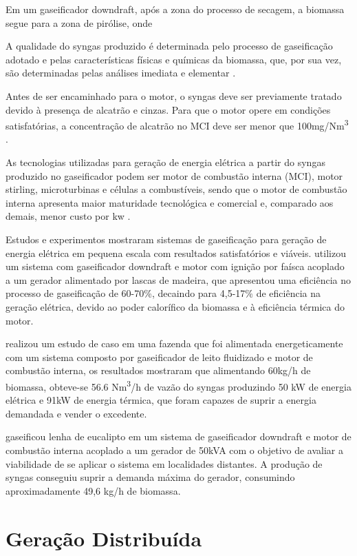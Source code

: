 Em um gaseificador downdraft, após a zona do processo de secagem, a biomassa segue para a zona de pirólise, onde 


A qualidade do syngas produzido é determinada pelo processo de gaseificação adotado e pelas características físicas e químicas da biomassa, que, por sua vez, são determinadas pelas análises imediata e elementar \cite{chaves2016}.

Antes de ser encaminhado para o motor, o syngas deve ser previamente tratado devido à presença de alcatrão e cinzas. Para que o motor opere em condições satisfatórias, a concentração de alcatrão no MCI deve ser menor que 100mg/Nm\textsuperscript{3} \cite{hasler1999}.

As tecnologias utilizadas para geração de energia elétrica a partir do syngas produzido no gaseificador podem ser motor de combustão interna (MCI), motor stirling, microturbinas e células a combustíveis, sendo que o motor de combustão interna apresenta maior maturidade tecnológica e comercial \cite{lora2006} e, comparado aos demais, menor custo por kw \cite{chaves2016}.

Estudos e experimentos mostraram sistemas de gaseificação para geração de energia elétrica em pequena escala com resultados satisfatórios e viáveis. \cite{chaves2016} utilizou um sistema com gaseificador downdraft e motor com ignição por faísca acoplado a um gerador alimentado por lascas de madeira, que apresentou uma eficiência no processo de gaseificação de 60-70\%, decaindo para 4,5-17\% de eficiência na geração elétrica, devido ao poder calorífico da biomassa e à eficiência térmica do motor.

\cite{villarini2015} realizou um estudo de caso  em uma fazenda que foi alimentada energeticamente com um sistema composto por gaseificador de leito fluidizado e motor de combustão interna, os resultados mostraram que alimentando 60kg/h de biomassa, obteve-se 56.6 Nm\textsuperscript{3}/h de vazão do syngas produzindo 50 kW de energia elétrica e 91kW de energia térmica, que foram capazes de suprir a energia demandada e vender o excedente.

\cite{figueiredo2012} gaseificou lenha de eucalipto em um sistema de gaseificador downdraft e motor de combustão interna acoplado a um gerador de 50kVA com o objetivo de avaliar a viabilidade de se aplicar o sistema em localidades distantes. A produção de syngas conseguiu suprir a demanda máxima do gerador, consumindo aproximadamente 49,6 kg/h de biomassa. 

\section{Geração Distribuída}